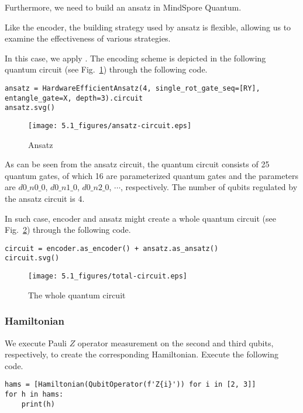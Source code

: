 Furthermore, we need to build an ansatz in MindSpore Quantum.

Like the encoder, the building strategy used by ansatz is flexible, allowing us to examine the effectiveness of various strategies.

In this case, we apply \HardwareEfficientAnsatz. The encoding scheme is depicted in the following quantum circuit (see Fig.~\ref{5.1ansatz-circuit}) through the following code.

\begin{lstlisting}
ansatz = HardwareEfficientAnsatz(4, single_rot_gate_seq=[RY], entangle_gate=X, depth=3).circuit
ansatz.svg()
\end{lstlisting}

\begin{figure}[H]
    \centering
    \texttt{[image: 5.1\_figures/ansatz-circuit.eps]}
    \caption{Ansatz}
    \label{5.1ansatz-circuit}
\end{figure}

As can be seen from the ansatz circuit, the quantum circuit consists of 25 quantum gates, of which 16 are parameterized quantum gates and the parameters are $d0\_n0\_0$, $d0\_n1\_0$, $d0\_n2\_0$, $\cdots$,  respectively. The number of qubits regulated by the ansatz circuit is 4.

In such case, encoder and ansatz might create a whole quantum circuit (see Fig.~\ref{5.1total-circuit}) through the following code.

\begin{lstlisting}
circuit = encoder.as_encoder() + ansatz.as_ansatz()
circuit.svg()
\end{lstlisting}

\begin{figure}[H]
    \centering
    \texttt{[image: 5.1\_figures/total-circuit.eps]}
    \caption{The whole quantum circuit}
    \label{5.1total-circuit}
\end{figure}

\subsubsection{Hamiltonian}
We execute Pauli $Z$ operator measurement on the second and third qubits, respectively, to create the corresponding Hamiltonian. Execute the following code.

\begin{lstlisting}
hams = [Hamiltonian(QubitOperator(f'Z{i}')) for i in [2, 3]]
for h in hams:
    print(h)
\end{lstlisting}

